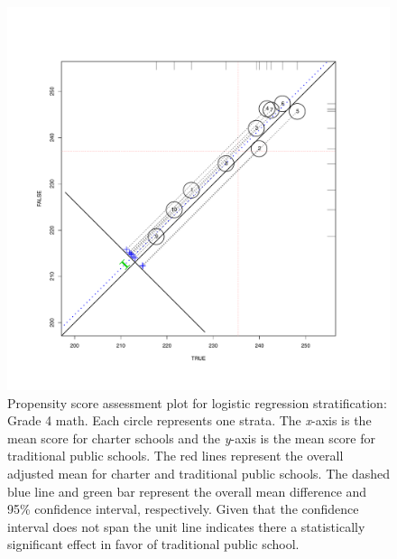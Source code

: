 \documentclass[letterpaper,12pt]{article} %
\begin{document}
\setlength{\belowcaptionskip}{-10pt}
\begin{figure}[t!]
\begin{center}
\includegraphics[width=\textwidth,trim=0 .7in 0 .7in]{../Figures2009/g4math-circpsa10.pdf}
\caption[Propensity score assessment plot for logistic regression stratification: Grade 4 math]{Propensity score assessment plot for logistic regression stratification: Grade 4 math. Each circle represents one strata. The \textit{x}-axis is the mean score for charter schools and the \textit{y}-axis is the mean score for traditional public schools. The red lines represent the overall adjusted mean for charter and traditional public schools. The dashed blue line and green bar represent the overall mean difference and 95\% confidence interval, respectively. Given that the confidence interval does not span the unit line indicates there a statistically significant effect in favor of traditional public school.}
\label{fig:g4math:circpsa}
\end{center}
\end{figure}
\setlength{\belowcaptionskip}{0pt}
\end{document}
